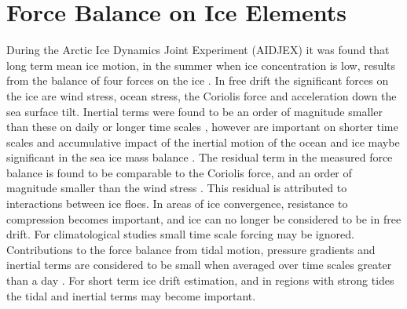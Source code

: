 \newcommand{\Div} {\nabla\cdot}
\newcommand{\Vecsymb}[1] {{\boldsymbol{#1}}}
\newcommand{\ddt}[1] {{\partial #1 \over \partial t }}
\newcommand{\Grad} {\nabla}



\chapter{Force Balance on Ice Elements}

During the Arctic Ice Dynamics Joint Experiment (AIDJEX) it was found that long term mean ice motion, in the summer when ice concentration is low, results from the balance of four forces on the ice \cite{Hunkins75, McPhee79}. In free drift the significant forces on the ice  are wind stress,   ocean stress, the Coriolis force and acceleration down the sea surface tilt. Inertial terms were found to be an order of magnitude smaller than these on daily or longer time scales \cite{Thorndike86}, however are important on shorter time scales and accumulative impact of the inertial motion of the ocean and ice maybe significant in the sea ice mass balance \cite{HeilandHibler2002}. The residual term in the measured force balance is found to be comparable to the Coriolis force, and an order of magnitude smaller than the wind stress \cite{McPhee79}. This residual is attributed to interactions between ice floes. In areas of ice convergence, resistance to compression becomes important, and ice can no longer be considered to be in free drift. For climatological studies small time scale forcing may be ignored. Contributions to the force balance from tidal motion, pressure gradients and inertial terms are considered to be small when averaged over time scales greater than a day \cite{McPhee79}. For short term ice drift estimation, and in regions with strong tides the tidal and inertial terms may become important. 

